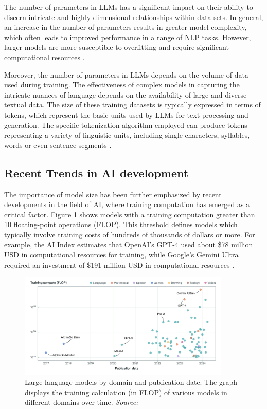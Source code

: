 The number of parameters in LLMs has a significant impact on their ability to discern intricate and highly dimensional relationships within data sets. In general, an increase in the number of parameters results in greater model complexity, which often leads to improved performance in a range of NLP tasks. However, larger models are more susceptible to overfitting and require significant computational resources \cite{zhao2023survey, villalobos2022machine, wei2022emergent}.

Moreover, the number of parameters in LLMs depends on the volume of data used during training. The effectiveness of complex models in capturing the intricate nuances of language depends on the availability of large and diverse textual data. The size of these training datasets is typically expressed in terms of tokens, which represent the basic units used by LLMs for text processing and generation. The specific tokenization algorithm employed can produce tokens representing a variety of linguistic units, including single characters, syllables, words or even sentence segments \cite{brown2020language}.

\subsection{Recent Trends in AI development}

The importance of model size has been further emphasized by recent developments in the field of AI, where training computation has emerged as a critical factor. Figure \ref{fig:large-scale-models} shows models with a training computation greater than 10 floating-point operations (FLOP). This threshold defines models which typically involve training costs of hundreds of thousands of dollars or more. For example, the AI Index estimates that OpenAI's GPT-4 used about \$78 million USD in computational resources for training, while Google's Gemini Ultra required an investment of \$191 million USD in computational resources \cite{epoch2024trackinglargescaleaimodels, maslej2024ai}.

\begin{figure}[h!]
    \centering
    \includegraphics[width=0.9\textwidth]{images/llms/large-scale-models-by-domain-and-date.jpg}
    \caption{Large language models by domain and publication date. The graph displays the training calculation (in FLOP) of various models in different domains over time. \textit{Source:} \cite{epoch2024trackinglargescaleaimodels}}
    \label{fig:large-scale-models}
\end{figure}

